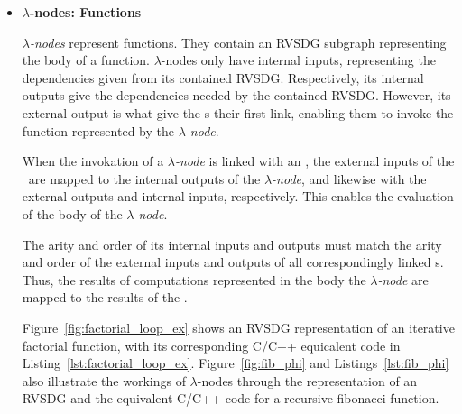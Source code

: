 \begin{itemize}
\item \textbf{$\lambda$-nodes: Functions}

\textit{$\lambda$-nodes} represent functions. They contain an RVSDG subgraph
representing the body of a function. $\lambda$-nodes only have internal
inputs, representing the dependencies given from its contained RVSDG.
Respectively, its internal outputs give the dependencies needed by the contained
RVSDG. However, its external output is what give the \applyNode s their first
link, enabling them to invoke the function represented by the
\textit{$\lambda$-node}.

When the invokation of a \textit{$\lambda$-node} is linked with an \applyNode ,
the external inputs of the \applyNode~are mapped to the internal outputs of the
\textit{$\lambda$-node}, and likewise with the external outputs and internal
inputs, respectively. This enables the evaluation of the body of the
\textit{$\lambda$-node}.

The arity and order of its internal inputs and outputs must match the arity and
order of the external inputs and outputs of all correspondingly linked
\applyNode s. Thus, the results of computations represented in the body the
\textit{$\lambda$-node} are mapped to the results of the \applyNode .

Figure~\ref{fig:factorial_loop_ex} shows an RVSDG representation of an iterative
factorial function, with its corresponding C/C++ equicalent code in
Listing~\ref{lst:factorial_loop_ex}. Figure~\ref{fig:fib_phi} and
Listings~\ref{lst:fib_phi} also illustrate the workings of $\lambda$-nodes
through the representation of an RVSDG and the equivalent C/C++ code for a
recursive fibonacci function.


\end{itemize}

